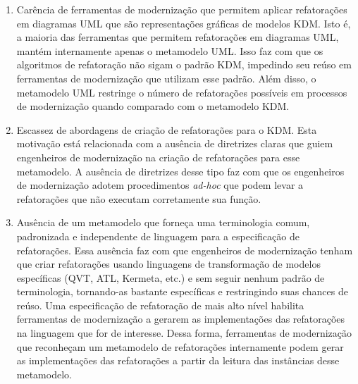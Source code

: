 \begin{enumerate}

\item Carência de ferramentas de modernização que permitem aplicar refatorações em diagramas UML que são representações gráficas de modelos KDM. Isto é, a maioria das ferramentas que permitem refatorações em diagramas UML, mantém internamente apenas o metamodelo UML. Isso faz com que os algoritmos de refatoração não sigam o padrão KDM, impedindo seu reúso em ferramentas de modernização que utilizam esse padrão. Além disso, o metamodelo UML restringe o número de refatorações possíveis em processos de modernização quando comparado com o metamodelo KDM.


\item Escassez de abordagens de criação de refatorações para o KDM. Esta motivação está relacionada com a ausência de diretrizes claras que guiem engenheiros de modernização na criação de refatorações para esse metamodelo. A ausência de diretrizes desse tipo faz com que os engenheiros de modernização adotem  procedimentos \textit{ad-hoc} que podem levar a refatorações que não executam corretamente sua função.






\item Ausência de um metamodelo que forneça uma terminologia comum, padronizada e independente de linguagem para a especificação de refatorações. Essa ausência faz com que engenheiros de modernização tenham que criar refatorações usando linguagens de transformação de modelos específicas (QVT, ATL, Kermeta, etc.) e sem seguir nenhum padrão de terminologia, tornando-as bastante específicas e restringindo suas chances de reúso. Uma especificação de refatoração de mais alto nível habilita ferramentas de modernização a gerarem as implementações das refatorações na linguagem que for de interesse. Dessa forma, ferramentas de modernização que reconheçam um metamodelo de refatorações internamente podem gerar as implementações das refatorações a partir da leitura das instâncias desse metamodelo.



\end{enumerate}
